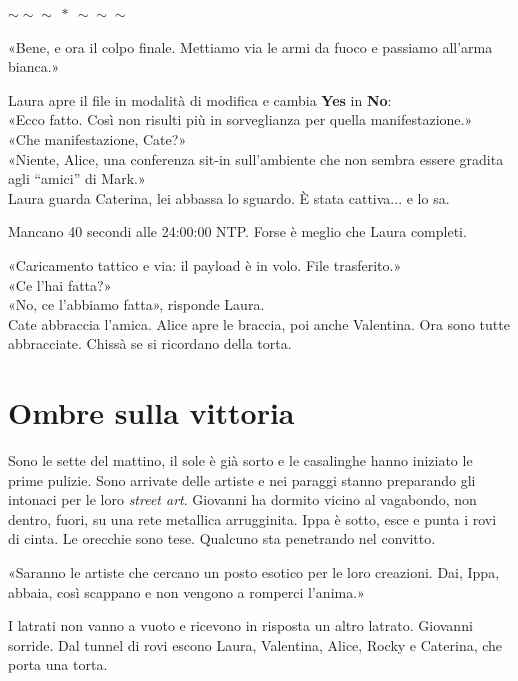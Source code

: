 \documentclass[10pt,oneside]{extbook}
\newcommand{\separatore}{\par
  \begin{center}
    {\Large $\sim\!\!\sim\!\!\sim\ \ast\ \sim\!\!\sim\!\!\sim$}
  \end{center}
  \par
}
\begin{document}
\separatore
\par\medskip
«Bene, e ora il colpo finale. Mettiamo via le armi da fuoco e passiamo all’arma bianca.»

\par\medskip
Laura apre il file in modalità di modifica e cambia \textbf{Yes} in \textbf{No}:\\
«Ecco fatto. Così non risulti pi\`u in sorveglianza per quella manifestazione.»\\
«Che manifestazione, Cate?»\\
«Niente, Alice, una conferenza sit-in sull’ambiente che non sembra essere gradita agli “amici” di Mark.»\\
Laura guarda Caterina, lei abbassa lo sguardo. \`E stata cattiva... e lo sa.

\par\medskip
Mancano 40 secondi alle 24:00:00 NTP. Forse \`e meglio che Laura completi.

\par\medskip
«Caricamento tattico e via: il payload \`e in volo. File trasferito.»\\
«Ce l’hai fatta?»\\
«No, ce l’abbiamo fatta», risponde Laura.\\
Cate abbraccia l’amica. Alice apre le braccia, poi anche Valentina. Ora sono tutte abbracciate. Chissà se si ricordano della torta.

\clearpage{}
\clearpage{}\chapter{Ombre sulla vittoria}

Sono le sette del mattino, il sole \`e gi\`a sorto e le casalinghe hanno iniziato le prime pulizie.
Sono arrivate delle artiste e nei paraggi stanno preparando gli intonaci per le loro \emph{street art}.
Giovanni ha dormito vicino al vagabondo, non dentro, fuori, su una rete metallica arrugginita.
Ippa \`e sotto, esce e punta i rovi di cinta.
Le orecchie sono tese.
Qualcuno sta penetrando nel convitto.

\par\medskip
«Saranno le artiste che cercano un posto esotico per le loro creazioni.
Dai, Ippa, abbaia, cos\`i scappano e non vengono a romperci l’anima.»

\par\medskip
I latrati non vanno a vuoto e ricevono in risposta un altro latrato.
Giovanni sorride.
Dal tunnel di rovi escono Laura, Valentina, Alice, Rocky e Caterina, che porta una torta.
\end{document}
